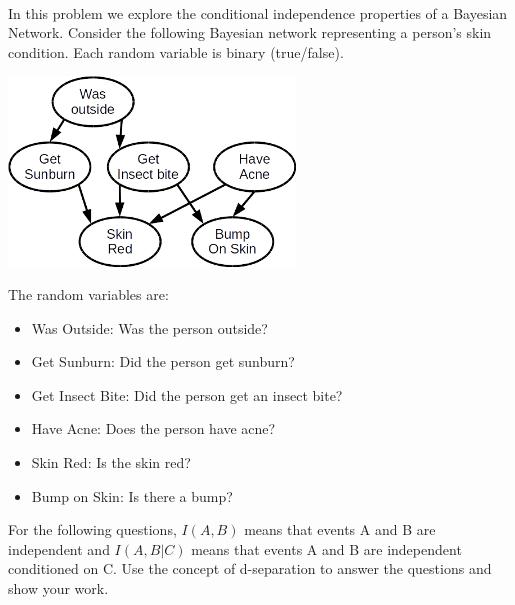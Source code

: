 \documentclass[submit]{harvardml}
\newcommand{\attr}[1]{\textsf{#1}}
\begin{document}
\begin{problem}
  ~

  \noindent In this problem we explore the conditional independence
  properties of a Bayesian Network.  Consider the following Bayesian
  network representing a person's skin condition. Each random variable is binary (true/false).
\begin{center}
\includegraphics[width=3in]{bn.png}
\end{center}
  
The random variables are:
%
\begin{itemize}
\item \attr{Was Outside}: Was the person outside?
\item \attr{Get Sunburn}: Did the person get sunburn?
\item \attr{Get Insect Bite}: Did the person get an insect bite?
\item \attr{Have Acne}: Does the person have acne?
\item \attr{Skin Red}: Is the skin red?
\item \attr{Bump on Skin}: Is there a bump?  
\end{itemize}

\medskip
 
For the following questions, $I(A,B)$ means that events A and B are independent and $I(A,B | C)$ means that events A and B are independent conditioned on C. Use the concept of d-separation to answer the questions and show your work.


\end{problem}
\end{document}

